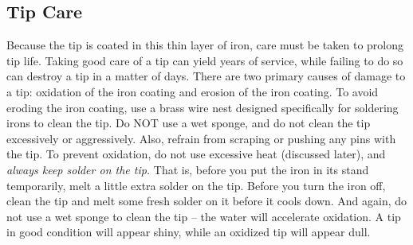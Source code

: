 \subsection{Tip Care}
Because the tip is coated in this thin layer of iron, care must be taken to prolong tip life. Taking good care of a tip can yield years of service, while failing to do so can destroy a tip in a matter of days. There are two primary causes of damage to a tip: oxidation of the iron coating and erosion of the iron coating. To avoid eroding the iron coating, use a brass wire nest designed specifically for soldering irons to clean the tip. Do NOT use a wet sponge, and do not clean the tip excessively or aggressively. Also, refrain from scraping or pushing any pins with the tip. To prevent oxidation, do not use excessive heat (discussed later), and \emph{always keep solder on the tip.} That is, before you put the iron in its stand temporarily, melt a little extra solder on the tip. Before you turn the iron off, clean the tip and melt some fresh solder on it before it cools down. And again, do not use a wet sponge to clean the tip – the water will accelerate oxidation. A tip in good condition will appear shiny, while an oxidized tip will appear dull.
